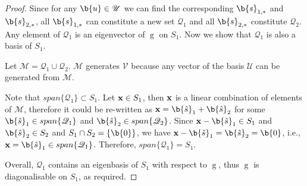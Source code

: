 \begin{proof}
Since for any $\b{u} \in \mathscr{U}$ we can find the corresponding $\b{s}_{1,*}$ and $\b{s}_{2,*}$, all $\b{s}_{1,*}$ can constitute a new set $\mathscr{Q}_1$ and all $\b{s}_{2,*}$ constitute $\mathscr{Q}_2$. Any element of $\mathscr{Q}_1$ is an eigenvector of $\operatorname{g}$ on $S_1$. Now we show that $\mathscr{Q}_1$ is also a basis of $S_1$. 

Let $\mathscr{M} = \mathscr{Q}_1 \cup \mathscr{Q}_2$. $\mathscr{M}$ generates $\mathcal{V}$ because any vector of the basis $\mathscr{U}$ can be generated from $\mathscr{M}$.

Note that $span\{\mathscr{Q}_1\} \subset S_1$. Let $\mathbf{x} \in S_1$, then $\mathbf{x}$ is a linear combination of elements of $\mathscr{M}$, therefore it could be re-written as $\x = \b{\hat{s}}_{1} + \b{\hat{s}}_{2}$ for some $\b{\hat{s}}_{1} \in span\{\mathscr{Q}_1\}$ and $\b{\hat{s}}_{2} \in span\{\mathscr{Q}_2\}$.
Since $\x - \b{\hat{s}}_{1} \in S_1$ and $\b{\hat{s}}_{2} \in S_2$ and $S_1 \cap S_2 = \{\b{0}\}$, we have $\x - \b{\hat{s}}_{1} = \b{\hat{s}}_{2} = \b{0}$, i.e., $\x = \b{\hat{s}}_{1} \in span\{\mathscr{Q}_1\}$. Therefore, $span\{\mathscr{Q}_1\} = S_1$.

Overall, $\mathscr{Q}_1$ contains an eigenbasis of $S_1$ with respect to $\operatorname{g}$, thus $\operatorname{g}$ is diagonalisable on $S_1$, as required.
\end{proof}


